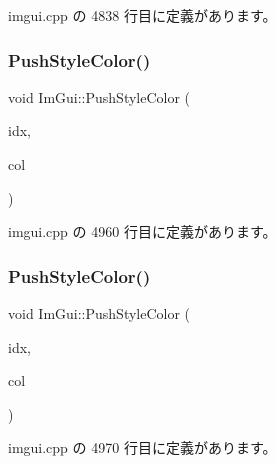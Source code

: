  imgui.\+cpp の 4838 行目に定義があります。

\mbox{\label{namespace_im_gui_a77ee84afb636e05eb4b2d6eeddcc2aa8}} 
\subsubsection{\texorpdfstring{Push\+Style\+Color()}{PushStyleColor()}\hspace{0.1cm}{\footnotesize\ttfamily [1/2]}}
{\footnotesize\ttfamily void Im\+Gui\+::\+Push\+Style\+Color (\begin{DoxyParamCaption}\item[{\mbox{\hyperlink{imgui_8h_a1b0467ec582e731ae6292fef726fb5fe}{Im\+Gui\+Col}}}]{idx,  }\item[{\mbox{\hyperlink{imgui_8h_a118cff4eeb8d00e7d07ce3d6460eed36}{Im\+U32}}}]{col }\end{DoxyParamCaption})}



 imgui.\+cpp の 4960 行目に定義があります。

\mbox{\label{namespace_im_gui_a5bd052ebf55015312a53739974950e7b}} 
\subsubsection{\texorpdfstring{Push\+Style\+Color()}{PushStyleColor()}\hspace{0.1cm}{\footnotesize\ttfamily [2/2]}}
{\footnotesize\ttfamily void Im\+Gui\+::\+Push\+Style\+Color (\begin{DoxyParamCaption}\item[{\mbox{\hyperlink{imgui_8h_a1b0467ec582e731ae6292fef726fb5fe}{Im\+Gui\+Col}}}]{idx,  }\item[{const \mbox{\hyperlink{struct_im_vec4}{Im\+Vec4}} \&}]{col }\end{DoxyParamCaption})}



 imgui.\+cpp の 4970 行目に定義があります。

\mbox{\label{namespace_im_gui_aab3f43009094462cf2a5eb554785949b}} 
